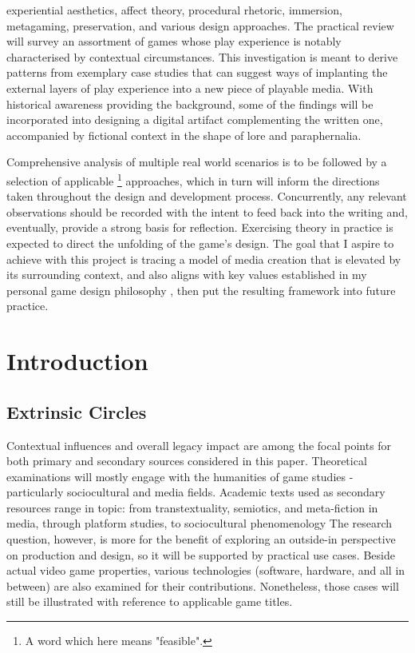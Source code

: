 \documentclass[12pt,oneside]{book}
\begin{document}
\begin{center}
\begin{singlespace}
    experiential aesthetics, affect theory, procedural rhetoric, immersion, metagaming, preservation, and various design approaches.
    The practical review will survey an assortment of games whose play experience is notably characterised by contextual circumstances.
    This investigation is meant to derive patterns from exemplary case studies that can suggest ways of implanting the external layers of play experience into a new piece of playable media.
    With historical awareness providing the background, some of the findings will be incorporated into designing a digital artifact complementing the written one, accompanied by fictional context in the shape of lore and paraphernalia.\par
    Comprehensive analysis of multiple real world scenarios is to be followed by a selection of applicable
    \footnote{A word which here means \parencite{asoue} "feasible".}
    approaches, which in turn will inform the directions taken throughout the design and development process.
    Concurrently, any relevant observations should be recorded with the intent to feed back into the writing and, eventually, provide a strong basis for reflection.
    Exercising theory in practice is expected to direct the unfolding of the game's design.
    The goal that I aspire to achieve with this project is tracing a model of media creation that is elevated by its surrounding context, and also aligns with key values established in my personal game design philosophy \parencite*[GD5609,][]{myDesignPhil}, then put the resulting framework into future practice.
\end{singlespace}\end{center}
\clearpage\restoregeometry\doublespacing

\chapter{Introduction\label{chap:1-intro}}
\section*{Extrinsic Circles}
Contextual influences and overall legacy impact are among the focal points for both primary and secondary sources considered in this paper.
Theoretical examinations will mostly engage with the humanities of game studies - particularly sociocultural and media fields.
Academic texts used as secondary resources range in topic:
 from transtextuality, semiotics, and meta-fiction in media, 
 through platform studies, 
 to sociocultural phenomenology
The research question, however, is more for the benefit of exploring an outside-in perspective on production and design, so it will be supported by practical use cases.
Beside actual video game properties, various technologies (software, hardware, and all in between) are also examined for their contributions.
Nonetheless, those cases will still be illustrated with reference to applicable game titles.
\end{document}
